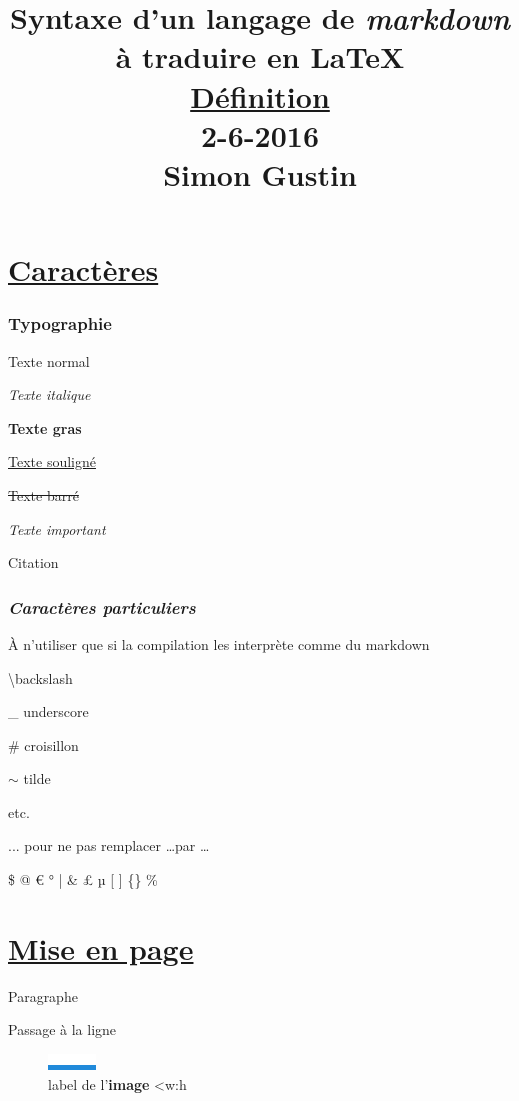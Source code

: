\documentclass{article}
\title{Syntaxe d'un langage de \textit{markdown} à traduire en \textbf{LaTeX}\\\underline{Définition}\\2-6-2016\\Simon Gustin}
\author{}
\date{}
\begin{document}
\maketitle

	

	\part{\underline{Caractères}}

		\section{\textbf{Typographie}}

			Texte normal

			\textit{Texte italique}

			\textbf{Texte gras}

			\underline{Texte souligné}

			\sout{Texte barré}

			\emph{Texte important}

			\textrm{Citation }

			

		\section{\textit{Caractères particuliers}}%

			À n'utiliser que si la compilation les interprète comme du markdown

			\textbackslash  backslash

			\_ underscore

			\# croisillon

			$\sim$ tilde

			etc.

			

			... pour ne pas remplacer \dots  par …

			

			\$ @ € ° | \& £ µ [ ] \{\} \%%

			

	\part{\underline{Mise en page}}

		Paragraphe

		Passage à la ligne

		

		\begin{figure}[h!]
			\centering
			\includegraphics{image.png}
			\caption{label de l'\textbf{image} <w:h}
		\end{figure}
\end{document}
